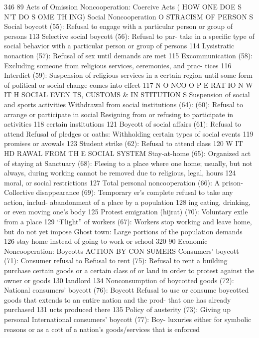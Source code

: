 \documentclass[twoside,a4paper,12pt,fleqn,openany]{extbook}
\begin{document}
 346
89
Acts of Omission
Noncooperation: Coercive Acts
( HOW ONE DOE S N’T DO S OME TH ING)
Social Noncooperation
O STRACISM OF PERSON S
Social boycott (55): Refusal to engage with a
particular person or group of persons
 113
Selective social boycott (56): Refusal to par-
take in a specific type of social behavior with a
particular person or group of persons
 114
Lysistratic nonaction (57): Refusal of sex until
demands are met
 115
Excommunication (58): Excluding someone
from religious services, ceremonies, and prac-
tices
 116
Interdict (59): Suspension of religious services
in a certain region until some form of political
or social change comes into effect
 117
N O NCO O P E RAT IO N W IT H SOCIAL EVEN TS, CUSTOMS & IN STITUTION S
Suspension of social and sports activities
 Withdrawal from social institutions (64):
(60): Refusal to arrange or participate in social
 Resigning from or refusing to participate in
activities
 118
 certain institutions
 121
Boycott of social affairs (61): Refusal to attend
 Refusal of pledges or oaths: Withholding
certain types of social events
 119
 promises or avowals
 123
Student strike (62): Refusal to attend class		
120
W IT HD RAWAL FROM TH E SOCIAL SYSTEM
Stay-at-home (65): Organized act of staying at
 Sanctuary (68): Fleeing to a place where one
home; usually, but not always, during working
 cannot be removed due to religious, legal,
hours
 124
 moral, or social restrictions
 127
Total personal noncooperation (66): A prison-
 Collective disappearance (69): Temporary
er’s complete refusal to take any action, includ-
 abandonment of a place by a population 128
ing eating, drinking, or even moving one’s
body
 125
 Protest emigration (hijrat) (70): Voluntary exile
from a place
 129
“Flight” of workers (67): Workers stop working
and leave home, but do not yet impose
 Ghost town: Large portions of the population
demands
 126
 stay home instead of going to work or school		
320
90
Economic Noncooperation: Boycotts
ACTION BY CON SUMERS
Consumers’ boycott (71): Consumer refusal to
 Refusal to rent (75): Refusal to rent a building
purchase certain goods or a certain class of
 or land in order to protest against the owner or
goods
 130
 landlord
 134
Nonconsumption of boycotted goods (72):
 National consumers’ boycott (76): Boycott
Refusal to use or consume boycotted goods
 that extends to an entire nation and the prod-
that one has already purchased
 131
 ucts produced there
 135
Policy of austerity (73): Giving up personal
 International consumers’ boycott (77): Boy-
luxuries either for symbolic reasons or as a
 cott of a nation’s goods/services that is enforced
\end{document}

